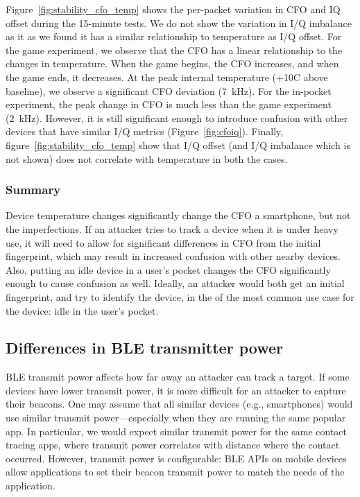 Figure~\ref{fig:stability_cfo_temp} shows the per-packet
variation in CFO and IQ offset during the 15-minute tests. We do not show the
variation in I/Q imbalance as it as we found it has a similar relationship to
temperature as I/Q offset. 
%
For the game experiment, we observe that the CFO
has a linear relationship to the changes in
temperature. When the game begins, the CFO increases, and when the game ends, it decreases.
At the peak internal temperature (+10\textdegree C above baseline),
we observe a significant CFO deviation (7~kHz).
%
%
For the in-pocket experiment, the peak change in CFO is much
less than the game experiment (2~kHz). However, it is
still significant enough to introduce confusion with other devices that have
similar I/Q metrics (Figure~\ref{fig:cfoiq}).
Finally, figure~\ref{fig:stability_cfo_temp} show that I/Q offset
(and I/Q imbalance which is not shown) does not correlate with
temperature in both the cases.

\subsubsection*{Summary} 
Device temperature changes significantly change the CFO
a smartphone, but not the \iq imperfections. If an attacker tries to track a device when it is under
heavy use, it will need to allow for significant differences in CFO from the
initial fingerprint, which may result in increased confusion with other nearby
devices. Also, putting an idle device in a user's pocket changes the CFO
significantly enough to cause confusion as well.  Ideally, an attacker would
both get an initial fingerprint, and try to identify the device, in the of the most common use case for the device: idle in
the user's pocket. 


\subsection{Differences in BLE transmitter power} %

BLE transmit power affects how far away an attacker can track a target.  If
some devices have lower transmit power, it is more difficult for an
attacker to capture their beacons.  One may assume that all similar devices
(e.g., smartphones) would use similar transmit power---especially when they are running the same popular
app. In particular, we would expect similar transmit power for
the same contact tracing apps, where transmit power correlates with distance where the
contact occurred.  However, transmit power is configurable: BLE
APIs on mobile devices allow applications to set their beacon transmit power
to match the needs of the application.

